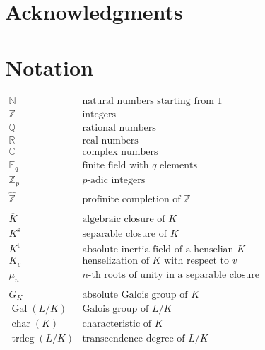 \section{Acknowledgments}

\clearpage

\section{Notation}

$\begin{array}{ll}
\mathbb{N} & \text{natural numbers starting from $1$} \\
\mathbb{Z} & \text{integers}\\
\mathbb{Q} & \text{rational numbers}\\
\mathbb{R} & \text{real numbers}\\
\mathbb{C} & \text{complex numbers}\\
\mathbb{F}_q & \text{finite field with $q$ elements}\\
\mathbb{Z}_p & \text{$p$-adic integers}\\
\widehat{\mathbb{Z}} & \text{profinite completion of $\mathbb{Z}$}\\
\\
\overline{K} & \text{algebraic closure of $K$}\\
K^\text{s} & \text{separable closure of $K$}\\
K^\text{t} & \text{absolute inertia field of a henselian $K$}\\
K_v & \text{henselization of $K$ with respect to $v$}\\
\mu_n & \text{$n$-th roots of unity in a separable closure}\\
\\
G_K & \text{absolute Galois group of $K$}\\
\operatorname{Gal}(L/K) & \text{Galois group of $L/K$}\\
\operatorname{char}(K) & \text{characteristic of $K$}\\
\operatorname{trdeg}(L/K) & \text{transcendence degree of $L/K$}\\
\end{array}$
